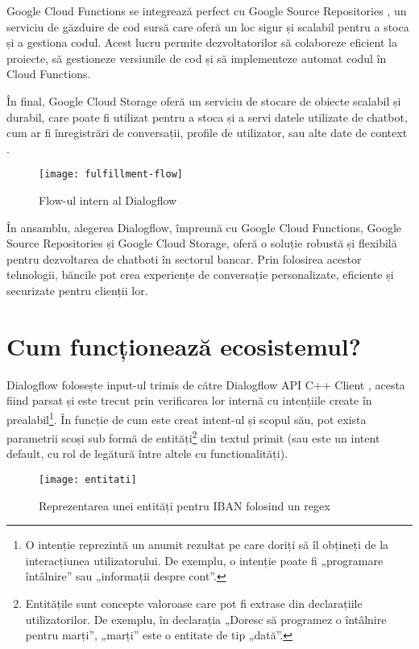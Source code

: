 Google Cloud Functions se integrează perfect cu Google Source Repositories \cite{google_source_repositories}, un serviciu de găzduire de cod sursă care oferă un loc sigur și scalabil pentru a stoca și a gestiona codul. Acest lucru permite dezvoltatorilor să colaboreze eficient la proiecte, să gestioneze versiunile de cod și să implementeze automat codul în Cloud Functions.

În final, Google Cloud Storage oferă un serviciu de stocare de obiecte scalabil și durabil, care poate fi utilizat pentru a stoca și a servi datele utilizate de chatbot, cum ar fi înregistrări de conversații, profile de utilizator, sau alte date de context \cite{google_cloud_storage}.

\begin{figure}[h]
    \centering
    \texttt{[image: fulfillment-flow]}
    \caption{Flow-ul intern al Dialogflow \cite{google_dialogflow}}
\end{figure}

În ansamblu, alegerea Dialogflow, împreună cu Google Cloud Functions, Google Source Repositories și Google Cloud Storage, oferă o soluție robustă și flexibilă pentru dezvoltarea de chatboti în sectorul bancar. Prin folosirea acestor tehnologii, băncile pot crea experiențe de conversație personalizate, eficiente și securizate pentru clienții lor.

\section{Cum funcționează ecosistemul?}

Dialogflow folosește input-ul trimis de către Dialogflow API C++ Client \cite{dialogflow_client_library}, acesta fiind parsat și este trecut prin verificarea lor internă cu intențiile create în prealabil\footnote{O intenție reprezintă un anumit rezultat pe care doriți să îl obțineți de la interacțiunea utilizatorului. De exemplu, o intenție poate fi „programare întâlnire” sau „informații despre cont”.}. În funcție de cum este creat intent-ul și scopul său, pot exista parametrii scoși sub formă de entități\footnote{Entitățile sunt concepte valoroase care pot fi extrase din declarațiile utilizatorilor. De exemplu, în declarația „Doresc să programez o întâlnire pentru marți”, „marți” este o entitate de tip „dată”.} din textul primit (sau este un intent default, cu rol de legătură între altele cu functionalități).

\begin{figure}[h]
    \centering
    \texttt{[image: entitati]}
    \caption{Reprezentarea unei entități pentru IBAN folosind un regex}
    \label{fig:entitati}
\end{figure}

